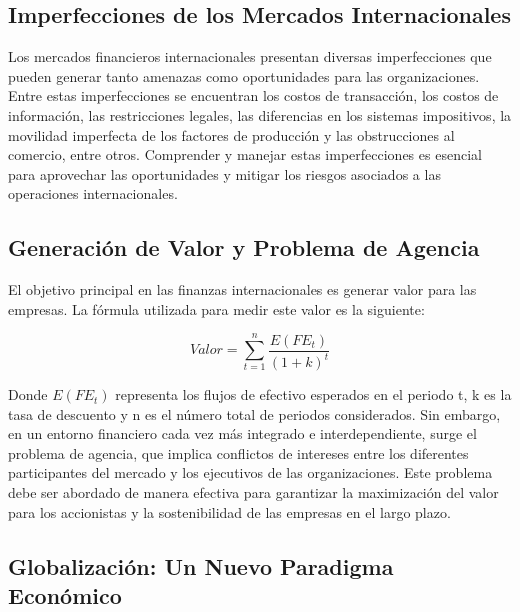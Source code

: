 \documentclass[
  a4paper,
]{article}
\begin{document}
\hypertarget{imperfecciones-de-los-mercados-internacionales}{%
\subsection{Imperfecciones de los Mercados
Internacionales}\label{imperfecciones-de-los-mercados-internacionales}}

Los mercados financieros internacionales presentan diversas
imperfecciones que pueden generar tanto amenazas como oportunidades para
las organizaciones. Entre estas imperfecciones se encuentran los costos
de transacción, los costos de información, las restricciones legales,
las diferencias en los sistemas impositivos, la movilidad imperfecta de
los factores de producción y las obstrucciones al comercio, entre otros.
Comprender y manejar estas imperfecciones es esencial para aprovechar
las oportunidades y mitigar los riesgos asociados a las operaciones
internacionales.

\hypertarget{generaciuxf3n-de-valor-y-problema-de-agencia}{%
\subsection{Generación de Valor y Problema de
Agencia}\label{generaciuxf3n-de-valor-y-problema-de-agencia}}

El objetivo principal en las finanzas internacionales es generar valor
para las empresas. La fórmula utilizada para medir este valor es la
siguiente:

\[
Valor = \sum_{t=1}^{n} \frac{E(FE_t)}{(1+k)^t}
\]

Donde \(E(FE_t)\) representa los flujos de efectivo esperados en el
periodo t, k es la tasa de descuento y n es el número total de periodos
considerados. Sin embargo, en un entorno financiero cada vez más
integrado e interdependiente, surge el problema de agencia, que implica
conflictos de intereses entre los diferentes participantes del mercado y
los ejecutivos de las organizaciones. Este problema debe ser abordado de
manera efectiva para garantizar la maximización del valor para los
accionistas y la sostenibilidad de las empresas en el largo plazo.

\hypertarget{globalizaciuxf3n-un-nuevo-paradigma-econuxf3mico}{%
\subsection{Globalización: Un Nuevo Paradigma
Económico}\label{globalizaciuxf3n-un-nuevo-paradigma-econuxf3mico}}
\end{document}
